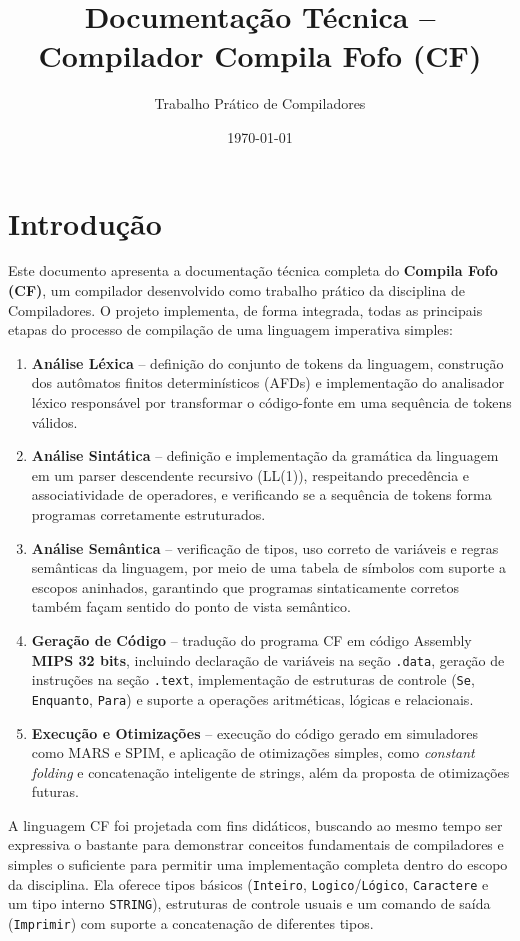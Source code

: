 \documentclass[12pt,a4paper]{article}
\title{Documentação Técnica -- Compilador Compila Fofo (CF)}
\author{Trabalho Prático de Compiladores}
\date{\today}
\begin{document}
\maketitle

\section*{Introdução}

Este documento apresenta a documentação técnica completa do \textbf{Compila Fofo (CF)}, um compilador desenvolvido como trabalho prático da disciplina de Compiladores. O projeto implementa, de forma integrada, todas as principais etapas do processo de compilação de uma linguagem imperativa simples:

\begin{enumerate}[label=\arabic*.]
  \item \textbf{Análise Léxica} -- definição do conjunto de tokens da linguagem, construção dos autômatos finitos determinísticos (AFDs) e implementação do analisador léxico responsável por transformar o código-fonte em uma sequência de tokens válidos.
  \item \textbf{Análise Sintática} -- definição e implementação da gramática da linguagem em um parser descendente recursivo (LL(1)), respeitando precedência e associatividade de operadores, e verificando se a sequência de tokens forma programas corretamente estruturados.
  \item \textbf{Análise Semântica} -- verificação de tipos, uso correto de variáveis e regras semânticas da linguagem, por meio de uma tabela de símbolos com suporte a escopos aninhados, garantindo que programas sintaticamente corretos também façam sentido do ponto de vista semântico.
  \item \textbf{Geração de Código} -- tradução do programa CF em código Assembly \textbf{MIPS 32 bits}, incluindo declaração de variáveis na seção \texttt{.data}, geração de instruções na seção \texttt{.text}, implementação de estruturas de controle (\texttt{Se}, \texttt{Enquanto}, \texttt{Para}) e suporte a operações aritméticas, lógicas e relacionais.
  \item \textbf{Execução e Otimizações} -- execução do código gerado em simuladores como MARS e SPIM, e aplicação de otimizações simples, como \emph{constant folding} e concatenação inteligente de strings, além da proposta de otimizações futuras.
\end{enumerate}

A linguagem CF foi projetada com fins didáticos, buscando ao mesmo tempo ser expressiva o bastante para demonstrar conceitos fundamentais de compiladores e simples o suficiente para permitir uma implementação completa dentro do escopo da disciplina. Ela oferece tipos básicos (\texttt{Inteiro}, \texttt{Logico}/\texttt{Lógico}, \texttt{Caractere} e um tipo interno \texttt{STRING}), estruturas de controle usuais e um comando de saída (\texttt{Imprimir}) com suporte a concatenação de diferentes tipos.
\end{document}
